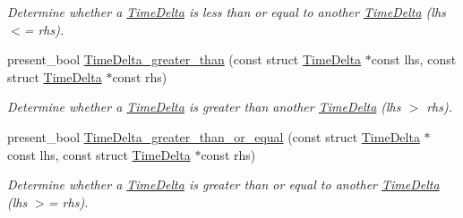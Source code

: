 \begin{DoxyCompactItemize}
\begin{DoxyCompactList}\small\item\em \-Determine whether a \hyperlink{structTimeDelta}{\-Time\-Delta} is less than or equal to another \hyperlink{structTimeDelta}{\-Time\-Delta} (lhs $<$= rhs). \end{DoxyCompactList}\item 
present\-\_\-bool \hyperlink{time-delta_8h_aaf70b7980933d5b2eb4261197da08d20}{\-Time\-Delta\-\_\-greater\-\_\-than} (const struct \hyperlink{structTimeDelta}{\-Time\-Delta} $\ast$const lhs, const struct \hyperlink{structTimeDelta}{\-Time\-Delta} $\ast$const rhs)
\begin{DoxyCompactList}\small\item\em \-Determine whether a \hyperlink{structTimeDelta}{\-Time\-Delta} is greater than another \hyperlink{structTimeDelta}{\-Time\-Delta} (lhs $>$ rhs). \end{DoxyCompactList}\item 
present\-\_\-bool \hyperlink{time-delta_8h_afc8207e3bd84d8037f99ad99a0c76b04}{\-Time\-Delta\-\_\-greater\-\_\-than\-\_\-or\-\_\-equal} (const struct \hyperlink{structTimeDelta}{\-Time\-Delta} $\ast$const lhs, const struct \hyperlink{structTimeDelta}{\-Time\-Delta} $\ast$const rhs)
\begin{DoxyCompactList}\small\item\em \-Determine whether a \hyperlink{structTimeDelta}{\-Time\-Delta} is greater than or equal to another \hyperlink{structTimeDelta}{\-Time\-Delta} (lhs $>$= rhs). \end{DoxyCompactList}\end{DoxyCompactItemize}


